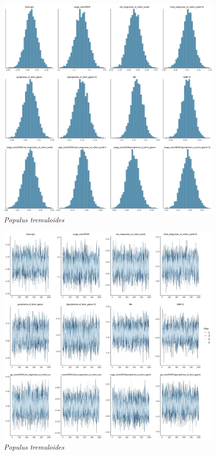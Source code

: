 \documentclass[letterpaper, 12pt]{article}
\begin{document}
\begin{figure}
	\centering
	\includegraphics[scale=0.4]{./195773-POP-TRE_hist}
	\caption{\textit{Populus tremuloides}}
\end{figure}

\begin{figure}
	\centering
	\includegraphics[scale=0.4]{./195773-POP-TRE_traces}
	\caption{\textit{Populus tremuloides}}
\end{figure}
\end{document}
